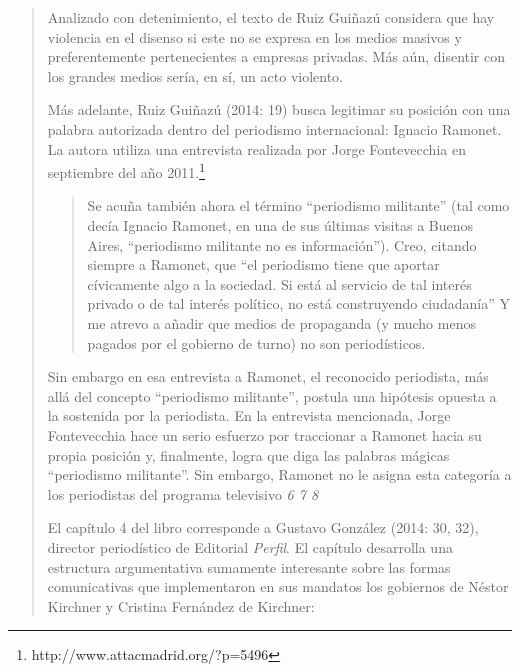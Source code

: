 \begin{quote}
Analizado con detenimiento, el texto de Ruiz Guiñazú considera que hay violencia en el disenso si este no se expresa en los medios masivos y preferentemente pertenecientes a empresas privadas. Más aún, disentir con los grandes medios sería, en sí, un acto violento.

Más adelante, Ruiz Guiñazú (2014: 19) busca legitimar su posición con una palabra autorizada dentro del periodismo internacional: Ignacio Ramonet. La autora utiliza una entrevista realizada por Jorge Fontevecchia en septiembre del año 2011.\footnote{http://www.attacmadrid.org/?p=5496}

\begin{quote}
	Se acuña también ahora el término \enquote{periodismo militante} (tal como decía Ignacio Ramonet, en una de sus últimas visitas a Buenos Aires, \enquote{periodismo militante no es información}). Creo, citando siempre a Ramonet, que \enquote{el periodismo tiene que aportar cívicamente algo a la sociedad. Si está al servicio de tal interés privado o de tal interés político, no está construyendo ciudadanía} Y me atrevo a añadir que medios de propaganda (y mucho menos pagados por el gobierno de turno) no son periodísticos.
\end{quote}


Sin embargo en esa entrevista a Ramonet, el reconocido periodista, más allá del concepto \enquote{periodismo militante}, postula una hipótesis opuesta a la sostenida por la periodista. En la entrevista mencionada, Jorge Fontevecchia hace un serio esfuerzo por traccionar a Ramonet hacia su propia posición y, finalmente, logra que diga las palabras mágicas \enquote{periodismo militante}. Sin embargo, Ramonet no le asigna esta categoría a los periodistas del programa televisivo \emph{6 7 8}

El capítulo 4 del libro corresponde a Gustavo González (2014: 30, 32), director periodístico de Editorial \emph{Perfil}. El capítulo desarrolla una estructura argumentativa sumamente interesante sobre las formas comunicativas que implementaron en sus mandatos los gobiernos de Néstor Kirchner y Cristina Fernández de Kirchner:


\end{quote}
